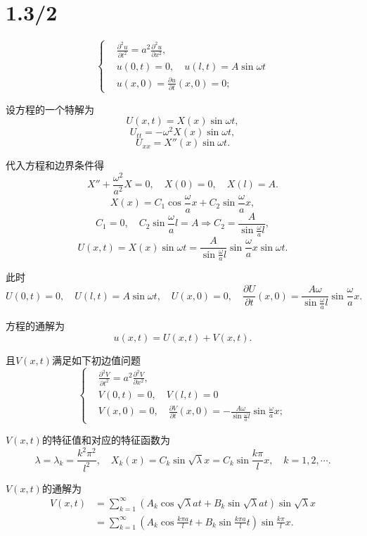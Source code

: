 \documentclass[11pt,a4paper]{article}
\begin{document}
\section{1.3/2}

$$
  \left\{\begin{aligned}
     & \frac{\partial^2u}{\partial t^2}=a^2\frac{\partial^2u}{\partial x^2}, \\
     & u(0,t)=0,\quad u(l,t)=A\sin\omega t                                   \\
     & u(x,0)=\frac{\partial u}{\partial t}(x,0)=0;
  \end{aligned}\right.
$$

设方程的一个特解为
$$U(x,t)=X(x)\sin\omega t,$$
$$U_{tt}=-\omega^2X(x)\sin\omega t,$$
$$U_{xx}=X''(x)\sin\omega t.$$

代入方程和边界条件得
$$X''+\frac{\omega^2}{a^2}X=0,\quad X(0)=0,\quad X(l)=A.$$
$$X(x)=C_1\cos\frac{\omega}{a}x+C_2\sin\frac{\omega}{a}x,$$
$$C_1=0,\quad C_2\sin\frac{\omega}{a}l=A\Longrightarrow
  C_2=\frac{A}{\sin\frac{\omega}{a}l},$$
$$U(x,t)=X(x)\sin\omega t=\frac{A}{\sin\frac{\omega}{a}l}\sin\frac{\omega}{a}x\sin\omega t.$$

此时
$$U(0,t)=0,\quad U(l,t)=A\sin\omega t,\quad U(x,0)=0,\quad \frac{\partial U}{\partial t}(x,0)=\frac{A\omega}{\sin\frac{\omega}{a}l}\sin\frac{\omega}{a}x.$$

方程的通解为
$$u(x,t)=U(x,t)+V(x,t).$$

且$V(x,t)$满足如下初边值问题
$$
  \left\{\begin{aligned}
     & \frac{\partial^2V}{\partial t^2}=a^2\frac{\partial^2V}{\partial x^2}, \\
     & V(0,t)=0,\quad V(l,t)=0                                               \\
     & V(x,0)=0,\quad \frac{\partial V}{\partial t}(x,0)
    =-\frac{A\omega}{\sin\frac{\omega}{a}l}\sin\frac{\omega}{a}x;
  \end{aligned}\right.
$$

$V(x,t)$的特征值和对应的特征函数为
$$\lambda=\lambda_k=\frac{k^2\pi^2}{l^2},\quad X_k(x)=C_k\sin\sqrt{\lambda}x=C_k\sin\frac{k\pi}{l}x,\quad k=1,2,\cdots.$$

$V(x,t)$的通解为
\begin{align*}
  V(x,t)
   & =\sum_{k=1}^\infty\left(A_k\cos\sqrt{\lambda}at+
  B_k\sin\sqrt{\lambda}at\right)\sin\sqrt{\lambda}x    \\
   & =\sum_{k=1}^\infty\left(A_k\cos\frac{k\pi a}{l}t+
  B_k\sin\frac{k\pi a}{l}t\right)\sin\frac{k\pi}{l}x.
\end{align*}
\end{document}
